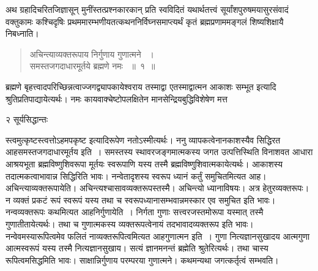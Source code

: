 \documentclass[11pt, openany]{book}
\begin{document}

 अथ ग्रहादिचरितजिज्ञासून् मुनींस्तत्प्रश्नकारकान् प्रति स्वविदितं यथार्थतत्त्वं सूर्यांशपुरुषमयासुरसंवादं वक्तुकामः  कश्चिदृषिः प्रथममारम्भणीयतत्कथननिर्विघ्नसमाप्त्यर्थं कृतं ब्रह्मप्रणाममङ्गलं शिष्यशिक्षायै निबध्नाति।

\begin{quote}
  
{\ssi अचिन्त्याव्यक्तरूपाय निर्गुणाय गुणात्मने ~।\\
समस्तजगदाधारमूर्तये ब्रह्मणे नमः ~॥~१~॥}
\end{quote}


 ब्रह्मणे बृहत्त्वादपरिच्छिन्नत्वाज्जगद्व्यापकायेश्वराय तस्माद्वा एतस्माद्वात्मन आकाशः सम्भूत इत्यादि श्रुतिप्रतिपाद्यायेत्यर्थः। नमः कायवाक्चेष्टोपलक्षितेन मानसेन्द्रियबुद्धिविशेषेण मत्त \textendash

\newpage


\noindent  २ \hspace{4cm} सूर्यसिद्धान्तः 

\vspace{1cm}

\noindent स्त्वमुत्कृष्टस्त्वत्तोऽहमपकृष्ट इत्यादिरूपेण नतोऽस्मीत्यर्थः। ननु व्यापकत्वेनानकाशस्यैव सिद्धिरत आह\textendash समस्तजगदाधारमूर्तय इति~। समस्तस्य स्थावरजङ्गमात्मकस्य जगत उत्पत्तिस्थिति विनाशवत आधारा आश्रयभूता ब्रह्मविष्णुशिवरूपा मूर्तयः स्वरूपाणि यस्य तस्मै ब्रह्मविष्णुशिवात्मकायेत्यर्थः। आकाशस्य तदात्मकत्वाभावान्न सिद्धिरिति भावः। नन्वेतादृशस्य स्वरूप ध्यानं कर्तुं समुचितमित्यत आह। अचिन्त्याव्यक्तरूपायेति। अचिन्त्यश्चासावव्यक्तरूपस्तस्मै। अचिन्त्यो ध्यानाविषयः। अत्र हेतुरव्यक्तरूपः। न व्यक्तं प्रकटं रूपं स्वरूपं यस्य तथा च स्वरूपध्यानासम्भवान्नमस्कार एव समुचित इति भावः। नन्वव्यक्तरूपः कथमित्यत आह\textendash निर्गुणायेति~। निर्गता गुणाः सत्त्वरजस्तमोरूपा यस्मात् तस्मै गुणातीतायेत्यर्थः। तथा च गुणात्मकस्य व्यक्तरूपत्वेनायं तदभावादव्यक्तरूप इति भावः। नन्वेवमस्यारूपित्वमेव फलितं नाव्यक्तरूपित्वमित्यत आह\textendash गुणात्मन इति~। गुणा नित्यज्ञानसुखादय आत्मगुणा आत्मस्वरूपं यस्य तस्मै नित्यज्ञानसुखाय। सत्यं ज्ञानमनन्तं ब्रह्मेति श्रुतेरित्यर्थः। तथा चास्य रूपित्वमसिद्धमिति भावः। साक्षान्निर्गुणाय परम्परया गुणात्मने। कथमन्यथा जगत्कर्तृत्वं सम्भवति।
\end{document}
